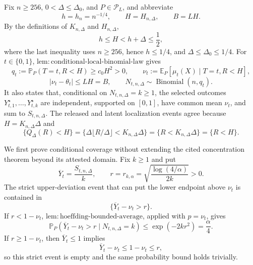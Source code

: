 Fix \(n\geq256\), \(0<\Delta\leq\Delta_0\), and \(P\in\mathcal P_L\), and abbreviate
\[
 h=h_n=n^{-1/4},\qquad H=H_{n,\Delta},\qquad B=LH.
\]
By the definitions of \(K_{n,\Delta}\) and \(H_{n,\Delta}\),
\[
 h\leq H<h+\Delta\leq\frac12,
\]
where the last inequality uses \(n\geq256\), hence \(h\leq1/4\), and \(\Delta\leq\Delta_0\leq1/4\).  For \(t\in\{0,1\}\), \(\mathrm{lem:conditional\text{-}local\text{-}binomial\text{-}law}\) gives
\[
 q_t:=\mathbb P_P(T=t,R<H)\geq c_0H^2>0,
 \qquad
 \nu_t:=\mathbb E_P[\mu_t(X)\mid T=t,R<H],
\]
\[
 |\nu_t-\theta_t|\leq LH=B,
 \qquad
 N_{t,n,\Delta}\sim\operatorname{Binomial}(n,q_t).
\]
It also states that, conditional on \(N_{t,n,\Delta}=k\geq1\), the selected outcomes \(Y_{t,1}^{\star},\ldots,Y_{t,k}^{\star}\) are independent, supported on \([0,1]\), have common mean \(\nu_t\), and sum to \(S_{t,n,\Delta}\).  The released and latent localization events agree because \(H=K_{n,\Delta}\Delta\) and
\[
 \{Q_\Delta(R)<H\}
 =\{\Delta\lfloor R/\Delta\rfloor<K_{n,\Delta}\Delta\}
 =\{R<K_{n,\Delta}\Delta\}
 =\{R<H\}.
\]

We first prove conditional coverage without extending the cited concentration theorem beyond its attested domain.  Fix \(k\geq1\) and put
\[
 \overline Y_t=\frac{S_{t,n,\Delta}}k,
 \qquad
 r=r_{k,\alpha}=\sqrt{\frac{\log(4/\alpha)}{2k}}>0.
\]
The strict upper-deviation event that can put the lower endpoint above \(\nu_t\) is contained in
\[
 \{\overline Y_t-\nu_t>r\}.
\]
If \(r<1-\nu_t\), \(\mathrm{lem:hoeffding\text{-}bounded\text{-}average}\), applied with \(p=\nu_t\), gives
\[
 \mathbb P_P(\overline Y_t-\nu_t>r\mid N_{t,n,\Delta}=k)
 \leq \exp(-2kr^2)=\frac\alpha4.
\]
If \(r\geq1-\nu_t\), then \(\overline Y_t\leq1\) implies
\[
 \overline Y_t-\nu_t\leq1-\nu_t\leq r,
\]
so this strict event is empty and the same probability bound holds trivially.

